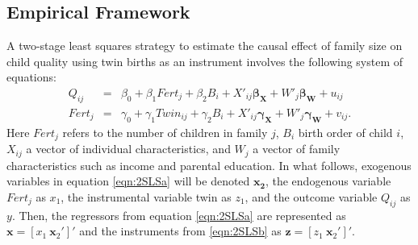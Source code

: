 \documentclass{article}[11pt,subeqn]
\newcommand{\vect}[1]{\mathbf{#1}}
\begin{document}
\begin{spacing}{1.5}
\section{Empirical Framework}
\label{scn:EF}
A two-stage least squares strategy to estimate the causal effect of family size on child quality using twin births as an instrument involves the following 
system of equations:
\begin{subequations}
\label{eqn:2SLS}
\begin{eqnarray}
\label{eqn:QQ}
Q_{ij}&=&\beta_0+\beta_1Fert_j+\beta_2B_{i}+X'_{ij}\vect{\beta_{\vect{X}}}+W'_j\vect{\beta_\vect{W}}+u_{ij} \label{eqn:2SLSa}\\
Fert_{j}&=&\gamma_0+\gamma_1Twin_{ij}+\gamma_2B_{i}+X'_{ij}\vect{\gamma_\vect{X}}+W'_j\vect{\gamma_\vect{W}}+v_{ij}. \label{eqn:2SLSb}
 \end{eqnarray}
\end{subequations}
Here $Fert_j$ refers to the number of children in family $j$, $B_i$ birth order of child $i$, $X_{ij}$ a vector of individual characteristics, and $W_j$ a vector 
of family characteristics such as income and parental education.  In what follows, exogenous variables in equation \ref{eqn:2SLSa} will be denoted 
$\mathbf{x_2}$, the endogenous variable $Fert_j$ as $x_1$, the instrumental variable twin as $z_1$, and the outcome variable $Q_{ij}$ as $y$.  
Then, the regressors from equation \ref{eqn:2SLSa} are represented as $\vect{x}=[x_1\ \vect{x}_2']'$ and the instruments from \ref{eqn:2SLSb} as 
$\vect{z}=[z_1\ \vect{x}_2']'$.


\end{spacing}
\end{document}
